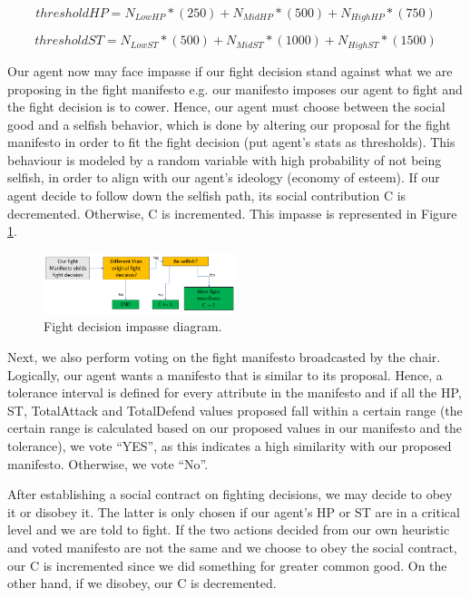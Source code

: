 \begin{equation}  
thresholdHP = N_{LowHP}*(250) + N_{MidHP}*(500) + N_{HighHP}*(750)
\label{eq:1}
\end{equation}

\begin{equation}  
thresholdST = N_{LowST}*(500) + N_{MidST}*(1000) + N_{HighST}*(1500)
\label{eq:2}
\end{equation}

\par Our agent now may face impasse if our fight decision stand against what we are proposing in the fight manifesto e.g. our manifesto imposes our agent to fight and the fight decision is to cower. Hence, our agent must choose between the social good and a selfish behavior, which is done by altering our proposal for the fight manifesto in order to fit the fight decision (put agent's stats as thresholds). This behaviour is modeled by a random variable with high probability of not being selfish, in order to align with our agent's ideology (economy of esteem). If our agent decide to follow down the selfish path, its social contribution C is decremented. Otherwise, C is incremented. This impasse is represented in Figure \ref{fig:impasse}.

\begin{figure}
    \centering
    \includegraphics[width=0.5\textwidth]{007_team_4_agent_design/figures/2_fight2.png}
    \caption{Fight decision impasse diagram.}
    \label{fig:impasse}
\end{figure}

\par Next, we also perform voting on the fight manifesto broadcasted by the chair. Logically, our agent wants a manifesto that is similar to its proposal. 
Hence, a tolerance interval is defined for every attribute in the manifesto and if all the HP, ST, TotalAttack and TotalDefend values proposed fall within a certain range (the certain range is calculated based on our proposed values in our manifesto and the tolerance),  we vote “YES”, as this indicates a high similarity with our proposed manifesto. Otherwise, we vote “No”. 

\par After establishing a social contract on fighting decisions, we may decide to obey it or disobey it. The latter is only chosen if our agent's HP or ST are in a critical level and we are told to fight. If the two actions decided from our own heuristic and voted manifesto are not the same and we choose to obey the social contract, our C is incremented since we did something for greater common good. On the other hand, if we disobey, our C is decremented.
 

